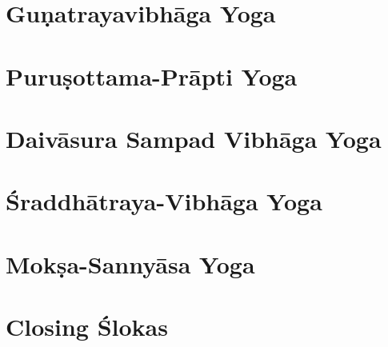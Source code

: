 \documentclass{scrbook}
\begin{document}
\chapter{Guṇatrayavibhāga Yoga}
\begin{multicols}{2}
    
\end{multicols}

\chapter{Puruṣottama-Prāpti Yoga}
\begin{multicols}{2}
    
\end{multicols}

\chapter{Daivāsura Sampad Vibhāga Yoga}
\begin{multicols}{2}
    
\end{multicols}

\chapter{Śraddhātraya-Vibhāga Yoga}
\begin{multicols}{2}
    
\end{multicols}

\chapter{Mokṣa-Sannyāsa Yoga}
\begin{multicols}{2}
    
\end{multicols}

\backmatter
\chapter{Closing Ślokas}

\end{document}
